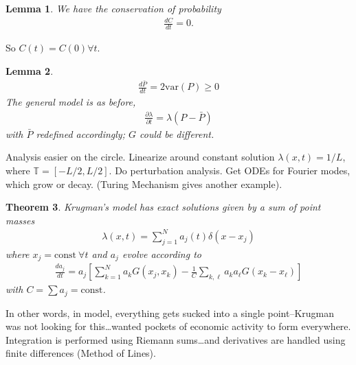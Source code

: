 \documentclass[12pt,reqno]{amsart}
\numberwithin{equation}{section}  %
\newcommand{\ci}{\mathbb{T}}
\newcommand{\p}{\partial}
\newtheorem{theorem}{Theorem}[section]
\newtheorem{lemma}[theorem]{Lemma}
\begin{document}
%
%
%
%
%
%
\begin{lemma}
%
We have the conservation of probability
%
\begin{equation*}
\begin{split}
\frac{dC}{dt} =0.
\end{split}
\end{equation*}
%
%
\label{lem:cons-prob}
\end{lemma}
%
%
So $C(t) = C(0) \forall t$. 
%
%
%
%
%
%
%                
%
%
%
%
\begin{lemma}
%
%
\begin{equation*}
\begin{split}
  \frac{d \bar{P}}{dt} = 2 \text{var}(P) \ge 0
\end{split}
\end{equation*}
%
%
The general model is as before, 
%
%
\begin{equation*}
\begin{split}
  \frac{\p \lambda}{\p t} = \lambda (P - \bar{P}) 
\end{split}
\end{equation*}
%
%
with $\bar{P}$ redefined accordingly; $G$ could be different.
\label{lem:deriv-barP}
\end{lemma}
%
%
Analysis easier on the circle. Linearize around constant solution
$\lambda(x,t) = 1/L$, where $\ci = [-L/2, L/2]$. Do perturbation analysis.
Get ODEs for Fourier modes, which grow or decay. (Turing Mechanism gives another
example).
%
%
%
%
%
%
%
%
%
%
\begin{theorem}
Krugman's model has exact solutions given by a sum of point masses
%
%
\begin{equation*}
\begin{split}
  \lambda(x,t) = \sum_{j=1}^{N} a_{j}(t) \delta(x - x_{j})
\end{split}
\end{equation*}
%
%
where $x_{j} = \text{const} \ \forall t$ and $a_{j}$ evolve according to 
%
%
\begin{equation*}
\begin{split}
  \frac{d a_{j}}{dt} = a_{j}\left[ \sum_{k=1}^{N} a_{k} G(x_{j}, x_{k}) -
  \frac{1}{C} \sum_{k, \ell} a_{k}a_{\ell} G(x_{k} - x_{\ell}) \right] 
\end{split}
\end{equation*}
%
%
with $C = \sum a_{j} = \text{const}$.
\label{thm:main-theorem}
\end{theorem}
%
%
In other words, in model, everything gets sucked into a single point--Krugman
was not looking for this\ldots wanted pockets of economic activity to form
everywhere. Integration is performed using Riemann sums\ldots and derivatives
are handled using finite differences (Method of Lines). 
%
%
%
%
%
%
%
%
%
\end{document}
